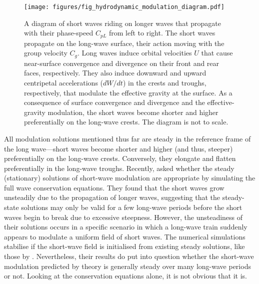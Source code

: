 \documentclass[lineno]{jfm}
\begin{document}
\begin{figure}
\centering
\texttt{[image: figures/fig\_hydrodynamic\_modulation\_diagram.pdf]}
\caption{
  A diagram of short waves riding on longer waves that propagate with their
  phase-speed $C_{pL}$ from left to right.
  The short waves propagate on the long-wave surface, their action
  moving with the group velocity $C_g$.
  Long waves induce orbital velocities $U$ that cause near-surface convergence
  and divergence on their front and rear faces, respectively.
  They also induce downward and upward centripetal accelerations
  ($dW/dt$) in the crests and troughs, respectively, that
  modulate the effective gravity at the surface.
  As a consequence of surface convergence and divergence and the effective-gravity
  modulation, the short waves become shorter and higher preferentially
  on the long-wave crests.
  The diagram is not to scale.
}
\label{fig:hydrodynamic_modulation_diagram}
\end{figure}

All modulation solutions mentioned thus far are steady in the reference frame
of the long wave---short waves become shorter and higher (and thus, steeper)
preferentially on the long-wave crests.
Conversely, they elongate and flatten preferentially in the long-wave troughs.
Recently, \citet{peureux2021unsteady} asked whether the steady (stationary) solutions
of short-wave modulation are appropriate by simulating the full wave conservation
equations.
They found that the short waves grow unsteadily due to the propagation of
longer waves, suggesting that the steady-state solutions may only be valid for
a few long-wave periods before the short waves begin to break due to excessive
steepness.
However, the unsteadiness of their solutions occurs in a specific scenario in
which a long-wave train suddenly appears to modulate a uniform field of short
waves.
The numerical simulations stabilise if the short-wave field is initialised
from existing steady solutions, like those by \citet{longuet1960changes}.
Nevertheless, their results do put into question whether the short-wave
modulation predicted by theory is generally steady over many long-wave periods
or not.
Looking at the conservation equations alone, it is not obvious that it is.
\end{document}
